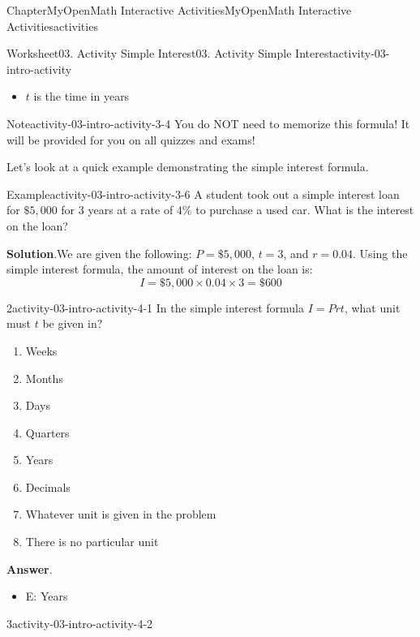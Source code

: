 \documentclass[oneside,10pt,]{book}
\newcommand{\blocktitlefont}{\relax}
\newcommand{\ptxlistdisc}{\raisebox{0.3ex}{\textbullet}}
\begin{document}
\begin{chapterptx}{Chapter}{MyOpenMath Interactive Activities}{}{MyOpenMath Interactive Activities}{}{}{activities}
\begin{worksheet-section}{Worksheet}{03. Activity Simple Interest}{}{03. Activity Simple Interest}{}{}{activity-03-intro-activity}
\begin{itemize}[label=\ptxlistdisc]
\item{}\(t\) is the time in years%
\end{itemize}
%
\begin{note}{Note}{}{activity-03-intro-activity-3-4}%
You do NOT need to memorize this formula! It will be provided for you on all quizzes and exams!%
\end{note}
Let's look at a quick example demonstrating the simple interest formula.%
\begin{example}{Example}{}{activity-03-intro-activity-3-6}%
A student took out a simple interest loan for \(\$5,000\) for \(3\) years at a rate of \(4\%\) to purchase a used car. What is the interest on the loan?%
\par\smallskip%
\noindent\textbf{\blocktitlefont Solution}.\hypertarget{activity-03-intro-activity-3-6-2}{}\quad{}We are given the following: \(P = \$5,000\), \(t = 3\), and \(r = 0.04\). Using the simple interest formula, the amount of interest on the loan is:%
\begin{equation*}
I = \$5,000 \times 0.04 \times 3 = \$600
\end{equation*}
%
\end{example}
\clearpage
\begin{divisionexercise}{2}{}{}{activity-03-intro-activity-4-1}%
In the simple interest formula \(\displaystyle{I}={P}{r}{t}\), what unit must \(\displaystyle{t}\) be given in?%
\par
%
\begin{enumerate}[label={(\alph*)}]
\item{}Weeks%
\item{}Months%
\item{}Days%
\item{}Quarters%
\item{}Years%
\item{}Decimals%
\item{}Whatever unit is given in the problem%
\item{}There is no particular unit%
\end{enumerate}
%
\par\smallskip%
\noindent\textbf{\blocktitlefont Answer}.\hypertarget{activity-03-intro-activity-4-1-2}{}\quad{}%
\begin{itemize}[label=\ptxlistdisc]
\item{}E: Years%
\end{itemize}
%
\end{divisionexercise}%
\begin{divisionexercise}{3}{}{}{activity-03-intro-activity-4-2}%

\end{divisionexercise}
\end{worksheet-section}
\end{chapterptx}
\end{document}
